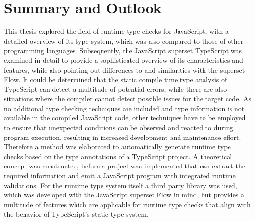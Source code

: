 \chapter{Summary and Outlook}
\label{cha:summary_outlook}

This thesis explored the field of runtime type checks for JavaScript, with a detailed overview of its type system, which was also compared to those of other programming languages. Subsequently, the JavaScript superset TypeScript was examined in detail to provide a sophisticated overview of its characteristics and features, while also pointing out differences to and similarities with the superset Flow. It could be determined that the static compile time type analysis of TypeScript can detect a multitude of potential errors, while there are also situations where the compiler cannot detect possible issues for the target code. As no additional type checking techniques are included and type information is not available in the compiled JavaScript code, other techniques have to be employed to ensure that unexpected conditions can be observed and reacted to during program execution, resulting in increased development and maintenance effort. Therefore a method was elaborated to automatically generate runtime type checks based on the type annotations of a TypeScript project. A theoretical concept was constructed, before a project was implemented that can extract the required information and emit a JavaScript program with integrated runtime validations. For the runtime type system itself a third party library was used, which was developed with the JavaScript superset Flow in mind, but provides a multitude of features which are applicable for runtime type checks that align with the behavior of TypeScript's static type system.

